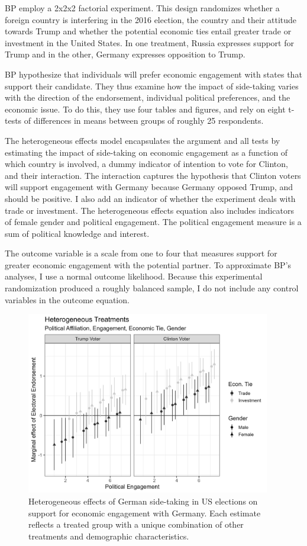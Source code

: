\documentclass[12pt]{article}
\begin{document}
BP employ a 2x2x2 factorial experiment.
This design randomizes whether a foreign country is interfering in the 2016 election, the country and their attitude towards Trump and whether the potential economic ties entail greater trade or investment in the United States.
In one treatment, Russia expresses support for Trump and in the other, Germany expresses opposition to Trump. 


BP hypothesize that individuals will prefer economic engagement with states that support their candidate. 
They thus examine how the impact of side-taking varies with the direction of the endorsement, individual political preferences, and the economic issue. 
To do this, they use four tables and figures, and rely on eight t-tests of differences in means between groups of roughly 25 respondents. 


The heterogeneous effects model encapsulates the argument and all tests by estimating the impact of side-taking on economic engagement as a function of which country is involved, a dummy indicator of intention to vote for Clinton, and their interaction. 
The interaction captures the hypothesis that Clinton voters will support engagement with Germany because Germany opposed Trump, and should be positive. 
I also add an indicator of whether the experiment deals with trade or investment. 
The heterogeneous effects equation also includes indicators of female gender and political engagement. 
The political engagement measure is a sum of political knowledge and interest. 


The outcome variable is a scale from one to four that measures support for greater economic engagement with the potential partner. 
To approximate BP's analyses, I use a normal outcome likelihood. 
Because this experimental randomization produced a roughly balanced sample, I do not include any control variables in the outcome equation. 


\begin{figure}[htpb]
	\centering
		\includegraphics[width=0.95\textwidth]{bp-het-est.png}
	\caption{Heterogeneous effects of German side-taking in US elections on support for economic engagement with Germany. Each estimate reflects a treated group with a unique combination of other treatments and demographic characteristics.}
	\label{fig:bp-het-est}
\end{figure}
\end{document}
